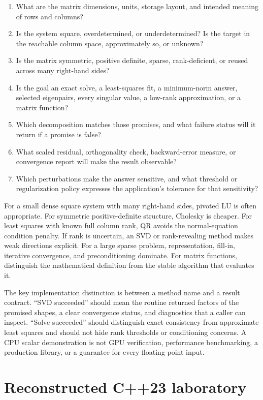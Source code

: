 \begin{enumerate}
\def\labelenumi{\arabic{enumi}.}
\tightlist
\item
  What are the matrix dimensions, units, storage layout, and intended meaning of rows and columns?
\item
  Is the system square, overdetermined, or underdetermined? Is the target in the reachable column space, approximately so, or unknown?
\item
  Is the matrix symmetric, positive definite, sparse, rank-deficient, or reused across many right-hand sides?
\item
  Is the goal an exact solve, a least-squares fit, a minimum-norm answer, selected eigenpairs, every singular value, a low-rank approximation, or a matrix function?
\item
  Which decomposition matches those promises, and what failure status will it return if a promise is false?
\item
  What scaled residual, orthogonality check, backward-error measure, or convergence report will make the result observable?
\item
  Which perturbations make the answer sensitive, and what threshold or regularization policy expresses the application's tolerance for that sensitivity?
\end{enumerate}

For a small dense square system with many right-hand sides, pivoted LU is often appropriate. For symmetric positive-definite structure, Cholesky is cheaper. For least squares with known full column rank, QR avoids the normal-equation condition penalty. If rank is uncertain, an SVD or rank-revealing method makes weak directions explicit. For a large sparse problem, representation, fill-in, iterative convergence, and preconditioning dominate. For matrix functions, distinguish the mathematical definition from the stable algorithm that evaluates it.

The key implementation distinction is between a method name and a result contract. ``SVD succeeded'' should mean the routine returned factors of the promised shapes, a clear convergence status, and diagnostics that a caller can inspect. ``Solve succeeded'' should distinguish exact consistency from approximate least squares and should not hide rank thresholds or conditioning concerns. A CPU scalar demonstration is not GPU verification, performance benchmarking, a production library, or a guarantee for every floating-point input.

\section{Reconstructed C++23 laboratory}\label{02-foundations-ii-ch038-reconstructed-c23-laboratory}

